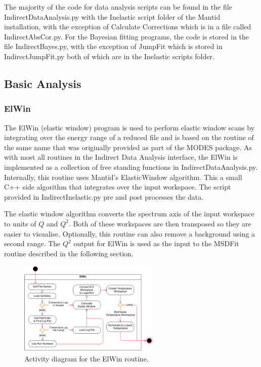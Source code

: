 \documentclass[paper=a4, fontsize=11pt]{scrartcl}	%
\numberwithin{equation}{section}															%
\numberwithin{figure}{section}																%
\numberwithin{table}{section}																%
\begin{document}
The majority of the code for data analysis scripts can be found in the file IndirectDataAnalysis.py with the Inelastic script folder of the Mantid installation, with the exception of Calculate Corrections which is in a file called IndirectAbsCor.py. For the Bayesian fitting programs, the code is stored in the file IndirectBayes.py, with the exception of JumpFit which is stored in IndirectJumpFit.py both of which are in the Inelastic scripts folder.

\subsection{Basic Analysis}
\subsubsection{ElWin}
The ElWin (elastic window) program is used to perform elastic window scans by integrating over the energy range of a reduced file and is based on the routine of the same name that was originally provided as part of the MODES package. As with most all routines in the Indirect Data Analysis interface, the ElWin is implemented as a collection of free standing functions in IndirectDataAnalysis.py. Internally, this routine uses Mantid's ElasticWindow algorithm. This a small C++ side algorithm that integrates over the input workspace. The script provided in IndirectInelastic.py pre and post processes the data. 

The elastic window algorithm converts the spectrum axis of the input workspace to units of $Q$ and $Q^2$. Both of these workspaces are then transposed so they are easier to visualise. Optionally, this routine can also remove a background using a second range. The $Q^2$ output for ElWin is used as the input to the MSDFit routine described in the following section.

\begin{figure}[H]
\centering
\includegraphics[width=0.6\textwidth]{img/uml/activity_diagrams/ElWin_activity.png}
\caption{Activity diagram for the ElWin routine.}
\label{fig:elwin-acticity-diagram}
\end{figure}
\end{document}
